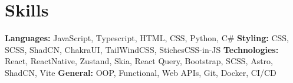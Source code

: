 \vspace{5 pt - 0.5 cm}
\section{Skills}
\begin{onecolentry}
    \textbf{Languages:} JavaScript, Typescript, HTML, CSS, Python, C\# \newline
    \textbf{Styling:} CSS, SCSS, ShadCN, ChakraUI, TailWindCSS, StichesCSS-in-JS \newline
    \textbf{Technologies:} React, ReactNative, Zustand, Skia, React Query, Bootstrap, SCSS, Astro, ShadCN, Vite   \newline
    \textbf{General:} OOP, Functional, Web APIs, Git, Docker, CI/CD \newline
\end{onecolentry}
